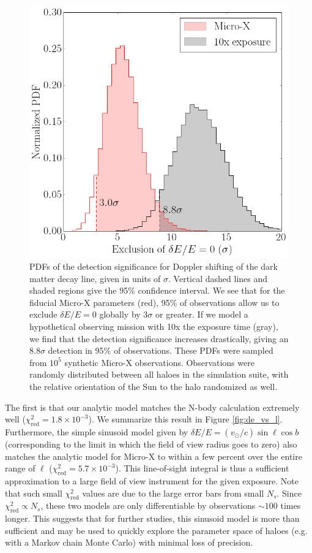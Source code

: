 \documentclass[aps,prd,10pt,twocolumn,superscriptaddress,showpacs]{revtex4-1}
\begin{document}
\begin{figure}[h!]
\centering
\includegraphics[width=1.0\columnwidth]{sig_pdf.png}
\caption{ 
	PDFs of the detection significance for Doppler shifting of the dark matter decay line, given in
	units of $\sigma$. Vertical dashed lines and shaded regions give the 95\% confidence interval.
	We see that for the fiducial Micro-X parameters (red), 95\% of observations allow us to exclude
	$\delta E/E=0$ globally by $3\sigma$ or greater. If we model a hypothetical observing mission with
	10x the exposure time (gray), we find that the detection significance increases drastically, giving an
	$8.8\sigma$ detection in 95\% of observations. 
	These PDFs were sampled from $10^5$ synthetic Micro-X observations. Observations were randomly distributed
	between all haloes in the simulation suite, with the relative orientation of the Sun to the halo
	randomized as well. 
}
\label{fig:sigma_pdf}
\end{figure}


The first is that our analytic model matches the N-body calculation
extremely well ($\chi^2_\mathrm{red}=1.8\times 10^{-3}$).  We summarize this result in Figure
\ref{fig:de_vs_l}. Furthermore, the simple sinusoid model given by $\delta E/E
= (v_\odot/c) \sin \ell \cos b$ (corresponding to the limit in which the field of view radius goes to
zero) also matches the analytic model for Micro-X to within a few percent over the entire range of
$\ell$ ($\chi^2_\mathrm{red}=5.7\times 10^{-3}$). This line-of-sight integral is thus
a sufficient approximation to a large field of view instrument for the given exposure. 
Note that such small $\chi^2_\mathrm{red}$ values are due to the large error bars from small $N_s$.
Since $\chi^2_\mathrm{red} \propto N_s$, these two models are 
only differentiable by observations $\sim 100$ times longer.  
This suggests that for further studies, this sinusoid model is more than sufficient and may be
used to quickly explore the parameter space of haloes (e.g. with a Markov chain Monte Carlo) with minimal loss of precision.
\end{document}
